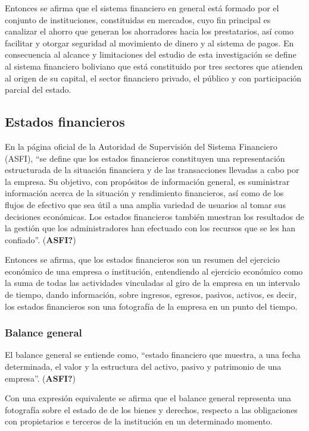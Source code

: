 \documentclass[
  12pt,
]{article}
\begin{document}
Entonces se afirma que el sistema financiero en general está formado por
el conjunto de instituciones, constituidas en mercados, cuyo fin
principal es canalizar el ahorro que generan los ahorradores hacia los
prestatarios, así como facilitar y otorgar seguridad al movimiento de
dinero y al sistema de pagos. En consecuencia al alcance y limitaciones
del estudio de esta investigación se define al sistema financiero
boliviano que está constituido por tres sectores que atienden al origen
de su capital, el sector financiero privado, el público y con
participación parcial del estado.

\hypertarget{estados-financieros}{%
\subsection{Estados financieros}\label{estados-financieros}}

En la página oficial de la Autoridad de Supervisión del Sistema
Financiero (ASFI), ``se define que los estados financieros constituyen
una representación estructurada de la situación financiera y de las
transacciones llevadas a cabo por la empresa. Su objetivo, con
propósitos de información general, es suministrar información acerca de
la situación y rendimiento financieros, así como de los flujos de
efectivo que sea útil a una amplia variedad de usuarios al tomar sus
decisiones económicas. Los estados financieros también muestran los
resultados de la gestión que los administradores han efectuado con los
recursos que se les han confiado''. (\textbf{ASFI?})

Entonces se afirma, que los estados financieros son un resumen del
ejercicio económico de una empresa o institución, entendiendo al
ejercicio económico como la suma de todas las actividades vinculadas al
giro de la empresa en un intervalo de tiempo, dando información, sobre
ingresos, egresos, pasivos, activos, es decir, los estados financieros
son una fotografía de la empresa en un punto del tiempo.

\hypertarget{balance-general}{%
\subsubsection{Balance general}\label{balance-general}}

El balance general se entiende como, ``estado financiero que muestra, a
una fecha determinada, el valor y la estructura del activo, pasivo y
patrimonio de una empresa''. (\textbf{ASFI?})

Con una expresión equivalente se afirma que el balance general
representa una fotografía sobre el estado de de los bienes y derechos,
respecto a las obligaciones con propietarios e terceros de la
institución en un determinado momento.
\end{document}
